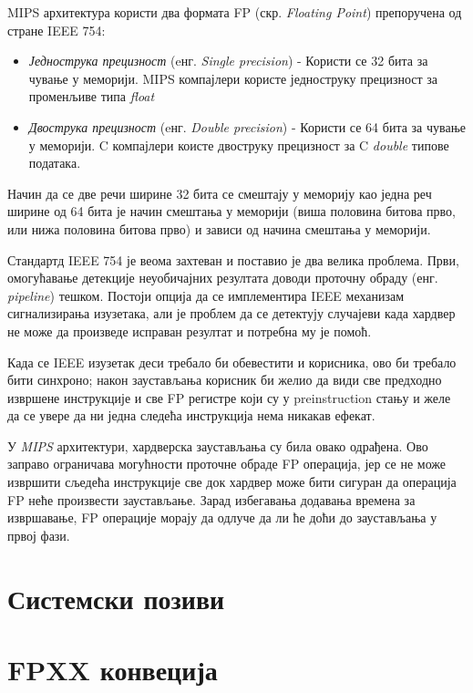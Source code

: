 \documentclass[12pt,oneside]{memoir}
\begin{document}
MIPS архитектура користи два формата FP (скр. \textit{Floating Point}) препоручена од стране IEEE 754:

\begin{itemize}
	\item \textit{Једнострука прецизност} (eнг. \textit{Single precision}) - Користи се 32 бита за чување у меморији. MIPS компајлери користе једноструку прецизност за променљиве типа \textit{float}
	\item \textit{Двострука прецизност} (eнг. \textit{Double precision}) - Користи се 64 бита за чување у меморији. C компајлери коисте двоструку прецизност за C \textit{double} типове података.
\end{itemize}

\indent Начин да се две речи ширине 32 бита се смештају у меморију као једна реч ширине од 64 бита је начин смештања у меморији (виша половина битова прво, или нижа половина битова прво) и зависи од начина смештања у меморији. 

\indent Стандартд IEEE 754 је веома захтеван и поставио је два велика проблема. Први, омогућавање детекције неуобичајних резултата доводи проточну обраду (енг. \textit{pipeline}) тешком. Постоји опција да се имплементира IEEE механизам сигнализирања изузетака, али је проблем да се детектују случајеви када хардвер не може да произведе исправан резултат и потребна му је помоћ.

\indent Када се IEEE изузетак деси требало би обевестити и корисника, ово би требало бити синхроно; након заустављања корисник би желио да види све предходно извршене инструкције и све FP регистре који су у preinstruction стању и желе да се увере да ни једна следећа инструкција нема никакав ефекат.

\indent У \textit{MIPS} архитектури, хардверска заустављања су била овако одрађена. Ово заправо ограничава могућности проточне обраде FP операција, јер се не може извршити сљедећа инструкције све док хардвер може бити сигуран да операција FP неће произвести заустављање. Зарад избегавања додавања времена за извршавање, FP операције морају да одлуче да ли ће доћи до заустављања у првој фази. 

\section{Системски позиви}




\section{FPXX конвеција}
\end{document}

